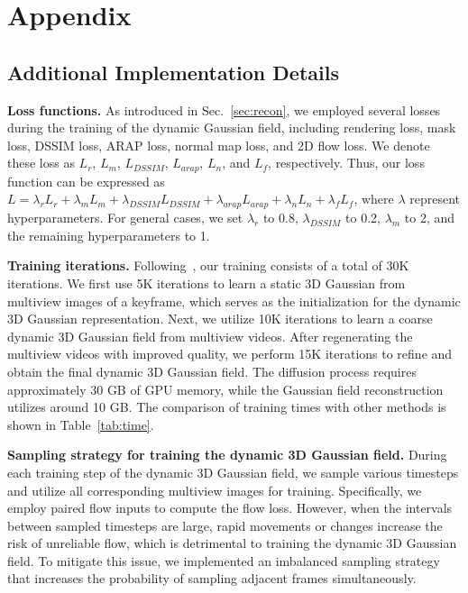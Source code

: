 \appendix

\newpage
\section{Appendix}

\subsection{Additional Implementation Details}

\textbf{Loss functions.} As introduced in Sec.~\ref{sec:recon}, we employed several losses during the training of the dynamic Gaussian field, including rendering loss, mask loss, DSSIM loss, ARAP loss, normal map loss, and 2D flow loss. We denote these loss as $L_r$, $L_m$, $L_{DSSIM}$, $L_{arap}$, $L_n$, and $L_f$, respectively. Thus, our loss function can be expressed as $L = \lambda_r L_r +\lambda_m L_m + \lambda_{DSSIM} L_{DSSIM} +\lambda_{arap} L_{arap} + \lambda_n L_n + \lambda_f L_f$, where $\lambda$ represent hyperparameters. For general cases, we set $\lambda_r$ to 0.8, $\lambda_{DSSIM}$ to 0.2, $\lambda_m$ to 2, and the remaining hyperparameters to 1.

\textbf{Training iterations.} Following~\citep{kerbl20233dgs}, our training consists of a total of 30K iterations. We first use 5K iterations to learn a static 3D Gaussian from multiview images of a keyframe, which serves as the initialization for the dynamic 3D Gaussian representation. Next, we utilize 10K iterations to learn a coarse dynamic 3D Gaussian field from multiview videos. After regenerating the multiview videos with improved quality, we perform 15K iterations to refine and obtain the final dynamic 3D Gaussian field.
The diffusion process requires approximately 30 GB of GPU memory, while the Gaussian field reconstruction utilizes around 10 GB. The comparison of training times with other methods is shown in Table~\ref{tab:time}.


\textbf{Sampling strategy for training the dynamic 3D Gaussian field.} During each training step of the dynamic 3D Gaussian field, we sample various timesteps and utilize all corresponding multiview images for training. Specifically, we employ paired flow inputs to compute the flow loss. However, when the intervals between sampled timesteps are large, rapid movements or changes increase the risk of unreliable flow, which is detrimental to training the dynamic 3D Gaussian field. To mitigate this issue, we implemented an imbalanced sampling strategy that increases the probability of sampling adjacent frames simultaneously.


